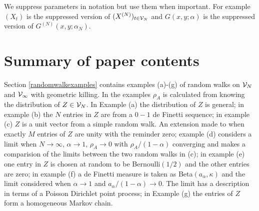 \documentclass[preprint,11pt]{elsarticle}
\theoremstyle{remark}
\begin{document}
{We suppress parameters in  notation but use them when important. For example $(X_t)$ is the suppressed version of $(X^{(N)})_{t\in {\cal V}_N}$ and $G(x,y;\alpha)$
is the suppressed version of 
$G^{(N)}(x,y;\alpha_N)$. 
%
\section{Summary of paper contents} 
Section \ref{randomwalkexamples} contains examples (a)-(g) of random walks on ${\cal V}_N$ and ${\cal V}_\infty$ with geometric killing. In the examples $\rho_A$ is calculated from knowing the distribution of $Z\in {\cal V}_N$.
In Example (a) the distribution of $Z$ is general; in example (b) the $N$ entries in $Z$ are from a $0-1$ de Finetti sequence; in example (c) $Z$ is a unit vector from a 
simple random walk. An extension made to when exactly $M$ entries of $Z$ are unity with the reminder zero; example (d) considers a limit when  $N\to \infty$, $\alpha \to 1$, $\rho_A \to 0$ with $\rho_A/(1-\alpha)$ converging and makes a comparision of the limits between the two random walks in (c); in example (e) one entry in $Z$ is chosen at random to be Bernoulli$(1/2)$
and the other entries are zero; in example (f) a de Finetti measure is taken as Beta$(a_\alpha,\kappa)$ and the limit considered when $\alpha \to 1$ and $a_\alpha/(1-\alpha) \to 0$. The limit has a description in terms of a Poisson Dirichlet point process; in Example (g) the entries of $Z$ form a homogeneous Markov chain.


}
\end{document}
